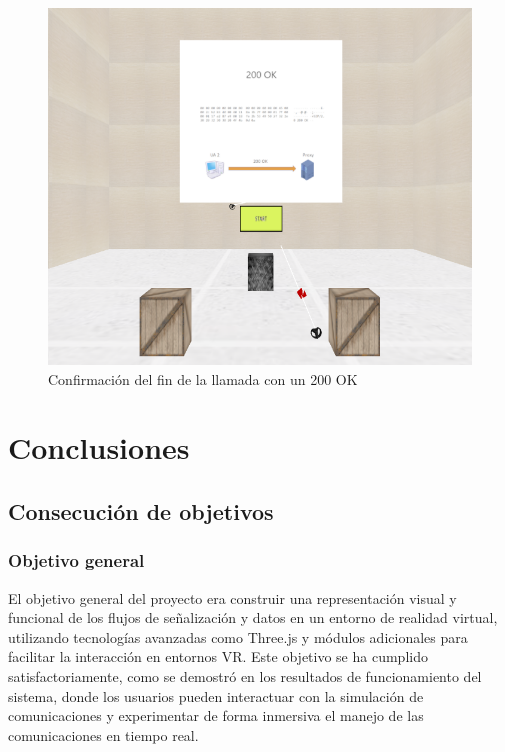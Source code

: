 \documentclass[a4paper, 12pt]{book}
\begin{document}
\begin{figure}
  \centering
  \includegraphics[width=12cm, keepaspectratio]{img/resultados/18-200OK.png}
  \caption{Confirmación del fin de la llamada con un 200 OK}
  \label{fig:18-200OK}
\end{figure}




\cleardoublepage
\chapter{Conclusiones}
\label{chap:conclusiones}


\section{Consecución de objetivos}
\label{sec:consecucion-objetivos}

\subsection{Objetivo general}
El objetivo general del proyecto era construir una representación visual y funcional de los flujos de señalización y 
datos en un entorno de realidad virtual, utilizando tecnologías avanzadas como Three.js y módulos adicionales para facilitar 
la interacción en entornos VR. Este objetivo se ha cumplido satisfactoriamente, como se demostró en los resultados de funcionamiento 
del sistema, donde los usuarios pueden interactuar con la simulación de comunicaciones y experimentar de forma inmersiva el manejo de 
las comunicaciones en tiempo real.
\end{document}
